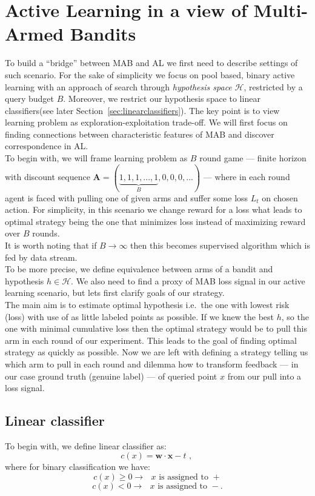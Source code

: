 \documentclass[12pt, a4paper, pdflatex]{report}
\begin{document}
\section{Active Learning in a view of Multi-Armed Bandits}
To build a ``bridge'' between MAB and AL we first need to describe settings of such scenario. For the sake of simplicity we focus on pool based, binary active learning with an approach of search through \emph{hypothesis space} $\mathscr{H}$, restricted by a query budget $B$. Moreover, we restrict our hypothesis space to linear classifiers(see later Section~\ref{sec:linearclassifiers}). The key point is to view learning problem as exploration-exploitation trade-off. We will first focus on finding connections between characteristic features of MAB and discover correspondence in AL.\\

To begin with, we will frame learning problem as $B$ round game --- finite horizon with discount sequence $\mathbf{A} = ( \underbrace{ 1, 1, 1, ..., 1}_{B}, 0, 0, 0, ... )$ --- where in each round agent is faced with pulling one of given arms and suffer some loss $L_t$ on chosen action. For simplicity, in this scenario we change reward for a loss what leads to optimal strategy being the one that minimizes loss instead of maximizing reward over $B$ rounds.\\

It is worth noting that if $B \rightarrow \infty$ then this becomes supervised algorithm which is fed by data stream.\\

To be more precise, we define equivalence between arms of a bandit and hypothesis $\mathit{h} \in \mathscr{H}$. We also need to find a proxy of MAB loss signal in our active learning scenario, but lets first clarify goals of our strategy.\\
The main aim is to estimate optimal hypothesis i.e.\ the one with lowest risk (loss) with use of as little labeled points as possible. If we knew the best $\mathit{h}$, so the one with minimal cumulative loss then the optimal strategy would be to pull this arm in each round of our experiment. This leads to the goal of finding optimal strategy as quickly as possible. Now we are left with defining a strategy telling us which arm to pull in each round and dilemma how to transform feedback --- in our case ground truth (genuine label) --- of queried point $x$ from our pull into a loss signal.\\

\subsection{Linear classifier\label{sec:linearclassifiers}}
To begin with, we define linear classifier as:
$$
c(x) = \mathbf{w} \cdot \mathbf{x} - t \text{~,~}
$$
where for binary classification we have:
$$
c(x) \geq 0 \rightarrow \text{ $x$ is assigned to $+$}
$$
$$
c(x) < 0 \rightarrow \text{ $x$ is assigned to $-$.}
$$\\
\end{document}
